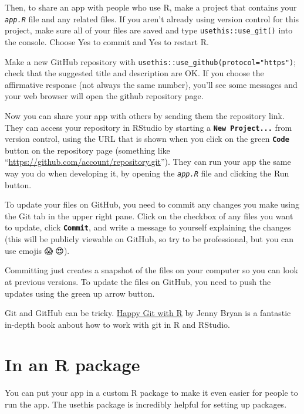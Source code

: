 \documentclass[
  oneside]{book}
\begin{document}
Then, to share an app with people who use R, make a project that contains your \textit{\texttt{app.R}} file and any related files. If you aren't already using version control for this project, make sure all of your files are saved and type \texttt{usethis::use\_git}\texttt{()} into the console. Choose Yes to commit and Yes to restart R.

Make a new GitHub repository with \texttt{usethis::use\_github}\texttt{(protocol="https")}; check that the suggested title and description are OK. If you choose the affirmative response (not always the same number), you'll see some messages and your web browser will open the github repository page.

Now you can share your app with others by sending them the repository link. They can access your repository in RStudio by starting a \textbf{\texttt{New\ Project...}} from version control, using the URL that is shown when you click on the green \textbf{\texttt{Code}} button on the repository page (something like ``\url{https://github.com/account/repository.git}''). They can run your app the same way you do when developing it, by opening the \textit{\texttt{app.R}} file and clicking the Run button.

To update your files on GitHub, you need to commit any changes you make using the Git tab in the upper right pane. Click on the checkbox of any files you want to update, click \textbf{\texttt{Commit}}, and write a message to yourself explaining the changes (this will be publicly viewable on GitHub, so try to be professional, but you can use emojis 😱🤪😍).

Committing just creates a snapshot of the files on your computer so you can look at previous versions. To update the files on GitHub, you need to push the updates using the green up arrow button.

\begin{info}
Git and GitHub can be tricky. \href{https://happygitwithr.com/}{Happy Git with R} by Jenny Bryan is a fantastic in-depth book anbout how to work with git in R and RStudio.

\end{info}

\hypertarget{in-an-r-package}{%
\section{In an R package}\label{in-an-r-package}}

You can put your app in a custom R package to make it even easier for people to run the app. The usethis package is incredibly helpful for setting up packages.
\end{document}
